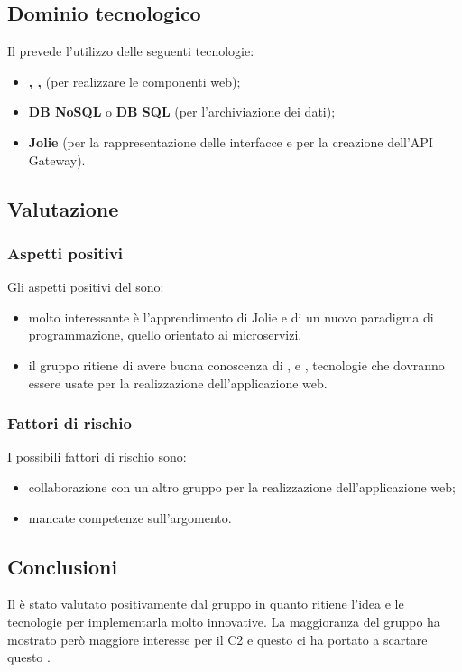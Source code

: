 	\subsection {Dominio tecnologico}
		Il  prevede l'utilizzo delle seguenti tecnologie:
		\begin {itemize}
			\item \textbf{, , } (per realizzare le componenti web);
			\item \textbf{DB NoSQL} o \textbf{DB SQL} (per l'archiviazione dei dati);
			\item \textbf{Jolie} (per la rappresentazione delle interfacce e per la creazione dell'API Gateway).
		\end {itemize}
	\subsection {Valutazione}
		\subsubsection {Aspetti positivi}
		Gli aspetti positivi del  sono:
			\begin{itemize}
				\item molto interessante è l'apprendimento di Jolie e di un nuovo paradigma di programmazione, quello orientato ai microservizi.
				\item il gruppo ritiene di avere buona conoscenza di ,  e , tecnologie che dovranno essere usate per la realizzazione dell'applicazione web.
			\end{itemize}
		\subsubsection {Fattori di rischio}
		I possibili fattori di rischio sono:
			\begin{itemize}
				\item collaborazione con un altro gruppo per la realizzazione dell'applicazione web;
				\item mancate competenze sull'argomento.
			\end{itemize}
	\subsection {Conclusioni}
		Il  è stato valutato positivamente dal gruppo in quanto ritiene l'idea e le tecnologie per implementarla molto innovative. La maggioranza del gruppo ha mostrato però maggiore interesse
		per il  C2 e questo ci ha portato a scartare questo .
